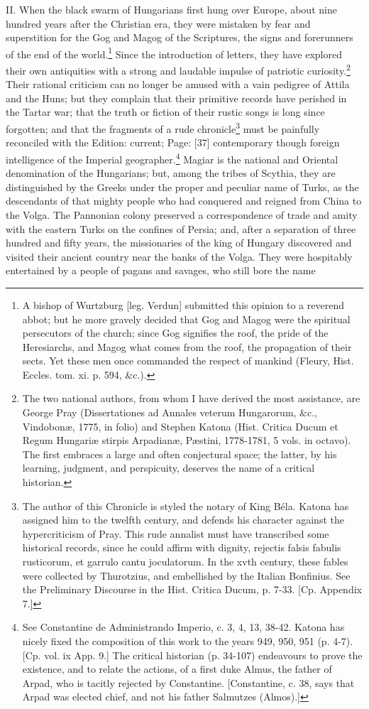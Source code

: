 II. When the black swarm of Hungarians first hung over Europe, about nine hundred years after the Christian era, they were mistaken by fear and superstition for the Gog and Magog of the Scriptures, the signs and forerunners of the end of the world.\footnote{A bishop of Wurtzburg [leg. Verdun] submitted this opinion to a reverend abbot; but he more gravely decided that Gog and Magog were the spiritual persecutors of the church; since Gog signifies the roof, the pride of the Heresiarchs, and Magog what comes from the roof, the propagation of their sects. Yet these men once commanded the respect of mankind (Fleury, Hist. Eccles. tom. xi. p. 594, \&c.).} Since the introduction of letters, they have explored their own antiquities with a strong and laudable impulse of patriotic curiosity.\footnote{The two national authors, from whom I have derived the most assistance, are George Pray (Dissertationes ad Annales veterum Hungarorum, \&c., Vindobonæ, 1775, in folio) and Stephen Katona (Hist. Critica Ducum et Regum Hungariæ stirpis Arpadianæ, Pæstini, 1778-1781, 5 vols. in octavo). The first embraces a large and often conjectural space; the latter, by his learning, judgment, and perspicuity, deserves the name of a critical historian.} Their rational criticism can no longer be amused with a vain pedigree of Attila and the Huns; but they complain that their primitive records have perished in the Tartar war; that the truth or fiction of their rustic songs is long since forgotten; and that the fragments of a rude chronicle\footnote{The author of this Chronicle is styled the notary of King Béla. Katona has assigned him to the twelfth century, and defends his character against the hypercriticism of Pray. This rude annalist must have transcribed some historical records, since he could affirm with dignity, rejectis falsis fabulis rusticorum, et garrulo cantu joculatorum. In the xvth century, these fables were collected by Thurotzius, and embellished by the Italian Bonfinius. See the Preliminary Discourse in the Hist. Critica Ducum, p. 7-33. [Cp. Appendix 7.]} must be painfully reconciled with the Edition: current; Page: [37] contemporary though foreign intelligence of the Imperial geographer.\footnote{See Constantine de Administrando Imperio, c. 3, 4, 13, 38-42. Katona has nicely fixed the composition of this work to the years 949, 950, 951 (p. 4-7). [Cp. vol. ix App. 9.] The critical historian (p. 34-107) endeavours to prove the existence, and to relate the actions, of a first duke Almus, the father of Arpad, who is tacitly rejected by Constantine. [Constantine, c. 38, says that Arpad was elected chief, and not his father Salmutzes (Almos).]} Magiar is the national and Oriental denomination of the Hungarians; but, among the tribes of Scythia, they are distinguished by the Greeks under the proper and peculiar name of Turks, as the descendants of that mighty people who had conquered and reigned from China to the Volga. The Pannonian colony preserved a correspondence of trade and amity with the eastern Turks on the confines of Persia; and, after a separation of three hundred and fifty years, the missionaries of the king of Hungary discovered and visited their ancient country near the banks of the Volga. They were hospitably entertained by a people of pagans and savages, who still bore the name 